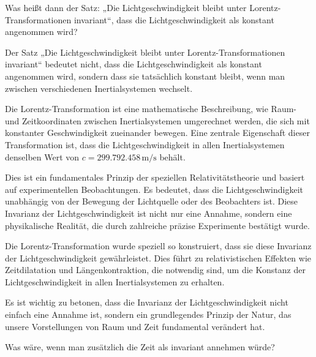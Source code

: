 \documentclass[a4paper,12pt]{article}
\begin{document}
	Was heißt dann der Satz: „Die Lichtgeschwindigkeit bleibt unter Lorentz-Transformationen invariant“, dass die Lichtgeschwindigkeit als konstant angenommen wird?
	
	Der Satz „Die Lichtgeschwindigkeit bleibt unter Lorentz-Transformationen invariant“ bedeutet nicht, dass die Lichtgeschwindigkeit als konstant angenommen wird, sondern dass sie tatsächlich konstant bleibt, wenn man zwischen verschiedenen Inertialsystemen wechselt.
	
	Die Lorentz-Transformation ist eine mathematische Beschreibung, wie Raum- und Zeitkoordinaten zwischen Inertialsystemen umgerechnet werden, die sich mit konstanter Geschwindigkeit zueinander bewegen. Eine zentrale Eigenschaft dieser Transformation ist, dass die Lichtgeschwindigkeit in allen Inertialsystemen denselben Wert von \( c = 299.792.458 \, \text{m/s} \) behält.
	
	Dies ist ein fundamentales Prinzip der speziellen Relativitätstheorie und basiert auf experimentellen Beobachtungen. Es bedeutet, dass die Lichtgeschwindigkeit unabhängig von der Bewegung der Lichtquelle oder des Beobachters ist. Diese Invarianz der Lichtgeschwindigkeit ist nicht nur eine Annahme, sondern eine physikalische Realität, die durch zahlreiche präzise Experimente bestätigt wurde.
	
	Die Lorentz-Transformation wurde speziell so konstruiert, dass sie diese Invarianz der Lichtgeschwindigkeit gewährleistet. Dies führt zu relativistischen Effekten wie Zeitdilatation und Längenkontraktion, die notwendig sind, um die Konstanz der Lichtgeschwindigkeit in allen Inertialsystemen zu erhalten.
	
	Es ist wichtig zu betonen, dass die Invarianz der Lichtgeschwindigkeit nicht einfach eine Annahme ist, sondern ein grundlegendes Prinzip der Natur, das unsere Vorstellungen von Raum und Zeit fundamental verändert hat.
	
	Was wäre, wenn man zusätzlich die Zeit als invariant annehmen würde?
	
\end{document}
